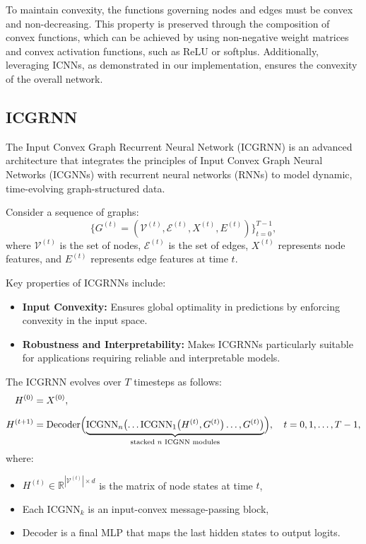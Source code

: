\documentclass{article} %
\begin{document}
To maintain convexity, the functions governing nodes and edges must be convex and non-decreasing. This property is preserved through the composition of convex functions, which can be achieved by using non-negative weight matrices and convex activation functions, such as ReLU or softplus. Additionally, leveraging ICNNs, as demonstrated in our implementation, ensures the convexity of the overall network.
\subsection{ICGRNN}
The Input Convex Graph Recurrent Neural Network (ICGRNN) is an advanced architecture that integrates the principles of Input Convex Graph Neural Networks (ICGNNs) with recurrent neural networks (RNNs) to model dynamic, time-evolving graph-structured data.

Consider a sequence of graphs:
\[
\{G^{(t)} = (\mathcal{V}^{(t)}, \mathcal{E}^{(t)}, X^{(t)}, E^{(t)})\}_{t=0}^{T-1},
\]
where \( \mathcal{V}^{(t)} \) is the set of nodes, \( \mathcal{E}^{(t)} \) is the set of edges, \( X^{(t)} \) represents node features, and \( E^{(t)} \) represents edge features at time \( t \).

Key properties of ICGRNNs include:
\begin{itemize}
   \item \textbf{Input Convexity:} Ensures global optimality in predictions by enforcing convexity in the input space.
   \item \textbf{Robustness and Interpretability:} Makes ICGRNNs particularly suitable for applications requiring reliable and interpretable models.
\end{itemize}

The ICGRNN evolves over \( T \) timesteps as follows:
\begin{align}
   H^{(0)} &= X^{(0)}, \\[6pt]
   H^{(t+1)} &= \mathrm{Decoder}\Bigl(
      \underbrace{
         \mathrm{ICGNN}_{n}\bigl(\dots \mathrm{ICGNN}_{1}\bigl(H^{(t)}, G^{(t)}\bigr) \dots, G^{(t)}\bigr)
      }_{\text{stacked $n$ ICGNN modules}}
   \Bigr), \quad t = 0, 1, \dots, T-1,
\end{align}
where:
\begin{itemize}
   \item \( H^{(t)} \in \mathbb{R}^{|\mathcal{V}^{(t)}| \times d} \) is the matrix of node states at time \( t \),
   \item Each \(\mathrm{ICGNN}_k\) is an input-convex message-passing block,
   \item \(\mathrm{Decoder}\) is a final MLP that maps the last hidden states to output logits.
\end{itemize}
\end{document}
